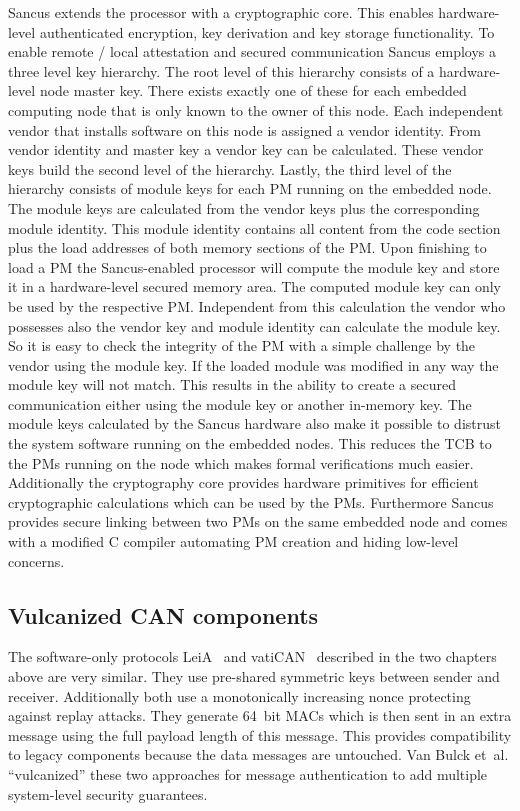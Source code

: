 Sancus extends the processor with a cryptographic core. This enables
hardware-level authenticated encryption, key derivation and key storage
functionality. To enable remote / local attestation and secured communication
Sancus employs a three level key hierarchy. The root level of this hierarchy
consists of a hardware-level node master key. There exists exactly one of these
for each embedded computing node that is only known to the owner of this node.
Each independent vendor that installs software on this node is assigned a vendor
identity. From vendor identity and master key a vendor key can be calculated.
These vendor keys build the second level of the hierarchy. Lastly, the third
level of the hierarchy consists of module keys for each PM running on the
embedded node. The module keys are calculated from the vendor keys plus the
corresponding module identity. This module identity contains all content from
the code section plus the load addresses of both memory sections of the PM\@.
Upon finishing to load a PM the Sancus-enabled processor will compute the module
key and store it in a hardware-level secured memory area. The computed module
key can only be used by the respective PM\@. Independent from this calculation
the vendor who possesses also the vendor key and module identity can calculate
the module key. So it is easy to check the integrity of the PM with a simple
challenge by the vendor using the module key. If the loaded module was modified
in any way the module key will not match. This results in the ability to create
a secured communication either using the module key or another in-memory key.
The module keys calculated by the Sancus hardware also make it possible to
distrust the system software running on the embedded nodes. This reduces the TCB
to the PMs running on the node which makes formal verifications much easier.
Additionally the cryptography core provides hardware primitives for efficient
cryptographic calculations which can be used by the PMs. Furthermore Sancus
provides secure linking between two PMs on the same embedded node and comes with
a modified C compiler automating PM creation and hiding low-level concerns.

\subsection{Vulcanized CAN components}

The software-only protocols LeiA~\cite{Radu2016} and
vatiCAN~\cite{Nurnberger2016} described in the two chapters above are very
similar. They use pre-shared symmetric keys between sender and receiver.
Additionally both use a monotonically increasing nonce protecting against replay
attacks. They generate 64~bit MACs which is then sent in an extra message using
the full payload length of this message. This provides compatibility to legacy
components because the data messages are untouched. Van Bulck et~al.
``vulcanized'' these two approaches for message authentication to add multiple
system-level security guarantees. 

